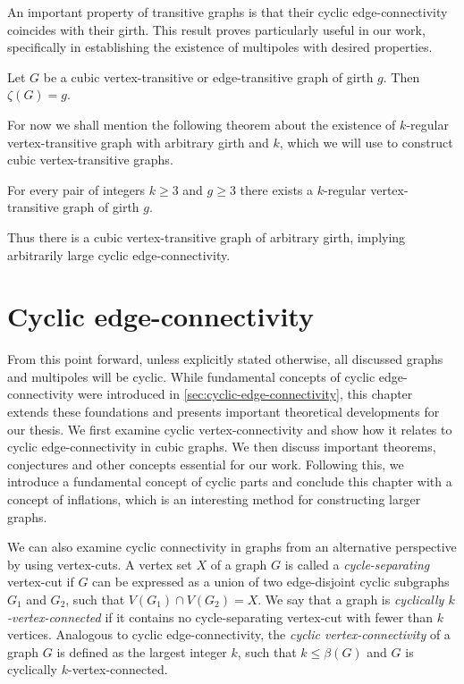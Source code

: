 \documentclass[12pt, twoside]{book}
\begin{document}
An important property of transitive graphs is that their cyclic edge-connectivity coincides with their girth. This result proves particularly useful in our work, specifically in establishing the existence of multipoles with desired properties.

\begin{theorem}\label{th:cyclic-connectivity-of-transitive}
	Let $G$ be a cubic \mbox{vertex-transitive} or \mbox{edge-transitive} graph of girth $g$. Then $\zeta(G) = g$.
\end{theorem}

For now we shall mention the following theorem about the existence of $k$-regular vertex-transitive graph with arbitrary girth and $k$, which we will use to construct cubic vertex-transitive graphs.

\begin{theorem}\label{th:vertex-transitive-girth-regular}
	For every pair of integers $k \geq 3$ and $g \geq 3$ there exists a $k$-regular vertex-transitive graph of girth $g$.
\end{theorem}

Thus there is a cubic vertex-transitive graph of arbitrary girth, implying arbitrarily large cyclic \mbox{edge-connectivity}.

\chapter{Cyclic edge-connectivity}\label{ch:cyclic-edge-connectivity}

From this point forward, unless explicitly stated otherwise, all discussed graphs and multipoles will be cyclic. While fundamental concepts of cyclic edge-connectivity were introduced in \cref{sec:cyclic-edge-connectivity}, this chapter extends these foundations and presents important theoretical developments for our thesis. We first examine cyclic vertex-connectivity and show how it relates to cyclic edge-connectivity in cubic graphs. We then discuss important theorems, conjectures and other concepts essential for our work. Following this, we introduce a fundamental concept of cyclic parts and conclude this chapter with a concept of inflations, which is an interesting method for constructing larger graphs.

We can also examine cyclic connectivity in graphs from an alternative perspective by using vertex-cuts. A vertex set $X$ of a graph $G$ is called a \mbox{\textit{cycle-separating}} vertex-cut if $G$ can be expressed as a union of two edge-disjoint cyclic subgraphs $G_1$ and $G_2$, such that $V(G_1) \cap V(G_2) = X$. We say that a graph is \textit{cyclically \mbox{$k$-vertex-connected}} if it contains no cycle-separating vertex-cut with fewer than $k$ vertices. Analogous to cyclic \mbox{edge-connectivity}, the \textit{cyclic \mbox{vertex-connectivity}} of a graph $G$ is defined as the largest integer $k$, such that $k\leq \beta(G)$ and $G$ is cyclically \mbox{$k$-vertex-connected}.
\end{document}
